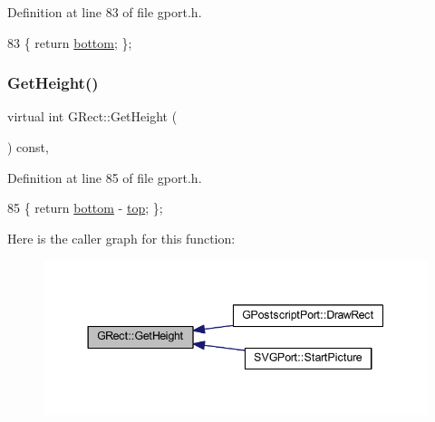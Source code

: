 Definition at line 83 of file gport.\+h.


\begin{DoxyCode}
83 \{ \textcolor{keywordflow}{return} \mbox{\hyperlink{class_g_rect_a767f1eb55f7e9880f58609406b2d6a66}{bottom}}; \};
\end{DoxyCode}
\mbox{\label{class_g_rect_a8d2b0a2c06688c2dad74bd0789f57d73}} 
\subsubsection{\texorpdfstring{Get\+Height()}{GetHeight()}}
{\footnotesize\ttfamily virtual int G\+Rect\+::\+Get\+Height (\begin{DoxyParamCaption}{ }\end{DoxyParamCaption}) const\hspace{0.3cm}{\ttfamily [inline]}, {\ttfamily [virtual]}}



Definition at line 85 of file gport.\+h.


\begin{DoxyCode}
85 \{ \textcolor{keywordflow}{return} \mbox{\hyperlink{class_g_rect_a767f1eb55f7e9880f58609406b2d6a66}{bottom}} - \mbox{\hyperlink{class_g_rect_af22c8a22a7d2fe0f139375e7eb171675}{top}}; \};
\end{DoxyCode}
Here is the caller graph for this function\+:\nopagebreak
\begin{figure}[H]
\begin{center}
\leavevmode
\includegraphics[width=344pt]{class_g_rect_a8d2b0a2c06688c2dad74bd0789f57d73_icgraph}
\end{center}
\end{figure}
\mbox{\label{class_g_rect_a2095ad1d204b942a45bc8ed1546df937}} 
